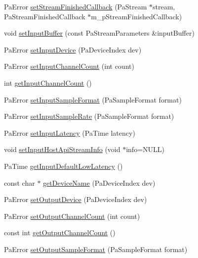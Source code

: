 \begin{DoxyCompactItemize}
\item 
Pa\-Error \hyperlink{class_port_audio_wrap_a85e2c0e5700cacd09a330cd6573cff7d}{set\-Stream\-Finished\-Callback} (Pa\-Stream $\ast$stream, Pa\-Stream\-Finished\-Callback $\ast$m\-\_\-p\-Stream\-Finished\-Callback)
\item 
void \hyperlink{class_port_audio_wrap_a132273a300efd015cf3d66ee5b250216}{set\-Input\-Buffer} (const Pa\-Stream\-Parameters \&input\-Buffer)
\item 
Pa\-Error \hyperlink{class_port_audio_wrap_abf1e9b6f6b6e09df0b926c7995963575}{set\-Input\-Device} (Pa\-Device\-Index dev)
\item 
Pa\-Error \hyperlink{class_port_audio_wrap_ac14a25862172c41c0186add676842859}{set\-Input\-Channel\-Count} (int count)
\item 
int \hyperlink{class_port_audio_wrap_a70ee9d33e7aecf0c2844060dc7628037}{get\-Input\-Channel\-Count} ()
\item 
Pa\-Error \hyperlink{class_port_audio_wrap_aaa979ac038d7cea196a012484aa84623}{set\-Input\-Sample\-Format} (Pa\-Sample\-Format format)
\item 
Pa\-Error \hyperlink{class_port_audio_wrap_af20b6e10b5e67bbc71a0ce405688d19c}{set\-Input\-Sample\-Rate} (Pa\-Sample\-Format format)
\item 
Pa\-Error \hyperlink{class_port_audio_wrap_a79575cbf76ba487b4edc3e6188e680ad}{set\-Input\-Latency} (Pa\-Time latency)
\item 
void \hyperlink{class_port_audio_wrap_a5ce5a1875848b5c93fb769d4186dbcf3}{set\-Input\-Host\-Api\-Stream\-Info} (void $\ast$info=N\-U\-L\-L)
\item 
Pa\-Time \hyperlink{class_port_audio_wrap_af2b23ddbc2df1f3a8f20ba59db2e26eb}{get\-Input\-Default\-Low\-Latency} ()
\item 
const char $\ast$ \hyperlink{class_port_audio_wrap_a17132c9ddbe6b7a184ad5d3ecf4aa66e}{get\-Device\-Name} (Pa\-Device\-Index dev)
\item 
Pa\-Error \hyperlink{class_port_audio_wrap_ac5fdc035a033cf426f259d4bac87e4ca}{set\-Output\-Device} (Pa\-Device\-Index dev)
\item 
Pa\-Error \hyperlink{class_port_audio_wrap_aac39854526473140e2b9bcf6c30ce876}{set\-Output\-Channel\-Count} (int count)
\item 
const int \hyperlink{class_port_audio_wrap_a29ae357027ce0ac70f52c5a8fc416b16}{get\-Output\-Channel\-Count} ()
\item 
Pa\-Error \hyperlink{class_port_audio_wrap_a342018893c092acac26509351b45602f}{set\-Output\-Sample\-Format} (Pa\-Sample\-Format format)

\end{DoxyCompactItemize}
